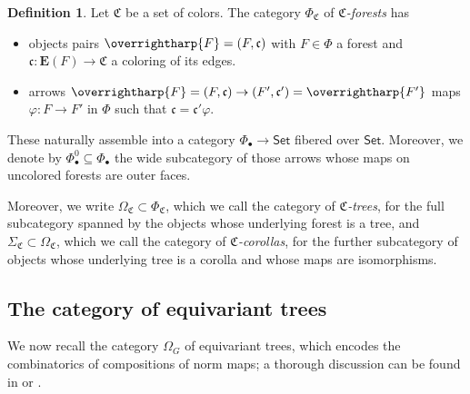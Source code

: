 \documentclass[a4paper,10pt
,draft
]{article}%
\numberwithin{equation}{section}
\numberwithin{figure}{section}
\theoremstyle{definition} %
\newtheorem{definition}[equation]{Definition}%
\newcommand{\vect}[1]{\text{\overrightharp{\ensuremath{#1}}}}
\newcommand{\Set}{\ensuremath{\mathsf{Set}}}
\newcommand{\1}{\ensuremath{\mathbbm 1}}%
\begin{document}
\begin{definition}\label{CFOREST_DEF}
      Let $\mathfrak C$ be a set of colors.
      The category $\Phi_{\mathfrak C}$ of \textit{$\mathfrak C$-forests} has
      \begin{itemize}
      \item objects pairs $\vect F = (F, \mathfrak c)$ with
            $F \in \Phi$ a forest and
            $\mathfrak c \colon \boldsymbol{E}(F) \to \mathfrak C$ a coloring of its edges.
      \item arrows $\vect F = (F, \mathfrak c) \to (F', \mathfrak c') = \vect{F'}$ maps
            $\varphi \colon F \to F'$ in $\Phi$ such that $\mathfrak c = \mathfrak c' \varphi$.
      \end{itemize}      

      These naturally assemble into a category $\Phi_\bullet \to \Set$ fibered over $\Set$.
      Moreover, we denote by
      $\Phi_\bullet^0 \subseteq \Phi_\bullet$
      the wide subcategory of those arrows whose maps on uncolored forests are outer faces.
      
      Moreover, we write
      $\Omega_{\mathfrak{C}} \subset \Phi_{\mathfrak{C}}$,
      which we call the category of 
      \emph{$\mathfrak{C}$-trees},
      for the full subcategory spanned by the objects 
      whose underlying forest is a tree,
      and 
      $\Sigma_{\mathfrak{C}} \subset \Omega_{\mathfrak{C}}$,
      which we call the category of 
      \emph{$\mathfrak{C}$-corollas},
      for the further subcategory of objects whose underlying tree is a corolla
      and whose maps are isomorphisms.
\end{definition}




\subsection{The category of equivariant trees}
\label{GTREES SEC}

We now recall the category $\Omega_G$ of equivariant trees, which encodes the combinatorics of compositions of norm maps;
a thorough discussion can be found in \cite{Per18} or \cite[\S 2]{BP_edss}.
\end{document}
